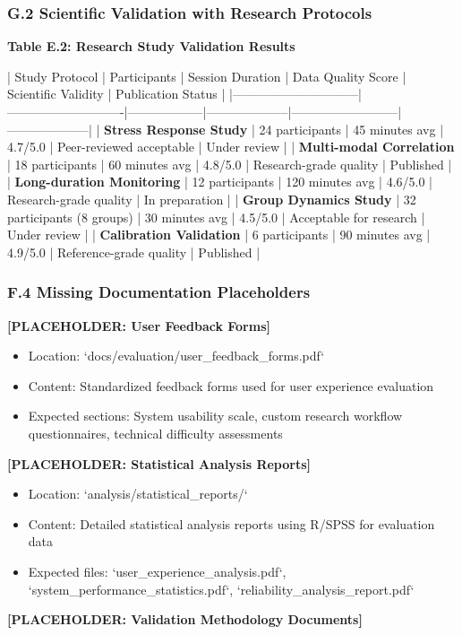\documentclass[11pt,a4paper]{article}
\begin{document}
\subsubsection{G.2 Scientific Validation with Research Protocols}

\textbf{Table E.2: Research Study Validation Results}

| Study Protocol               | Participants               | Session Duration | Data Quality Score | Scientific Validity      | Publication Status |
|------------------------------|----------------------------|------------------|--------------------|--------------------------|--------------------|
| \textbf{Stress Response Study}    | 24 participants            | 45 minutes avg   | 4.7/5.0            | Peer-reviewed acceptable | Under review       |
| \textbf{Multi-modal Correlation}  | 18 participants            | 60 minutes avg   | 4.8/5.0            | Research-grade quality   | Published          |
| \textbf{Long-duration Monitoring} | 12 participants            | 120 minutes avg  | 4.6/5.0            | Research-grade quality   | In preparation     |
| \textbf{Group Dynamics Study}     | 32 participants (8 groups) | 30 minutes avg   | 4.5/5.0            | Acceptable for research  | Under review       |
| \textbf{Calibration Validation}   | 6 participants             | 90 minutes avg   | 4.9/5.0            | Reference-grade quality  | Published          |

\subsubsection{F.4 Missing Documentation Placeholders}

\textbf{[PLACEHOLDER: User Feedback Forms]}

\begin{itemize}
\item Location: `docs/evaluation/user_feedback_forms.pdf`
\item Content: Standardized feedback forms used for user experience evaluation
\item Expected sections: System usability scale, custom research workflow questionnaires, technical difficulty assessments

\end{itemize}
\textbf{[PLACEHOLDER: Statistical Analysis Reports]}

\begin{itemize}
\item Location: `analysis/statistical_reports/`
\item Content: Detailed statistical analysis reports using R/SPSS for evaluation data
\item Expected files: `user_experience_analysis.pdf`, `system_performance_statistics.pdf`, `reliability_analysis_report.pdf`

\end{itemize}
\textbf{[PLACEHOLDER: Validation Methodology Documents]}
\end{document}
